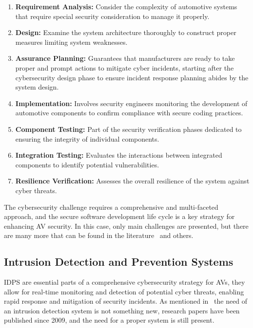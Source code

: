 \begin{enumerate}
    \item \textbf{Requirement Analysis:} Consider the complexity of automotive systems that require special security consideration to manage it properly.
    \item \textbf{Design:} Examine the system architecture thoroughly to construct proper measures limiting system weaknesses.
    \item \textbf{Assurance Planning:} Guarantees that manufacturers are ready to take proper and prompt actions to mitigate cyber incidents, starting after the cybersecurity design phase to ensure incident response planning abides by the system design.
    \item \textbf{Implementation:} Involves security engineers monitoring the development of automotive components to confirm compliance with secure coding practices.
    \item \textbf{Component Testing:} Part of the security verification phases dedicated to ensuring the integrity of individual components.
    \item \textbf{Integration Testing:} Evaluates the interactions between integrated components to identify potential vulnerabilities.
    \item \textbf{Resilience Verification:} Assesses the overall resilience of the system against cyber threats.
\end{enumerate}

The cybersecurity challenge requires a comprehensive and multi-faceted approach, and the secure software development life cycle is a key strategy for enhancing AV security.
In this case, only main challenges are presented, but there are many more that can be found in the literature~\cite{moukahal2021towards} and others.

\subsection{Intrusion Detection and Prevention Systems}\label{subsec:intrusion-detection-and-prevention-systems}
IDPS are essential parts of a comprehensive cybersecurity strategy for AVs, they allow for real-time monitoring and detection of potential cyber threats, enabling rapid response and mitigation of security incidents.
As mentioned in~\cite{kim2020cybersecurity} the need of an intrusion detection system is not something new, research papers have been published since 2009, and the need for a proper system is still present.

